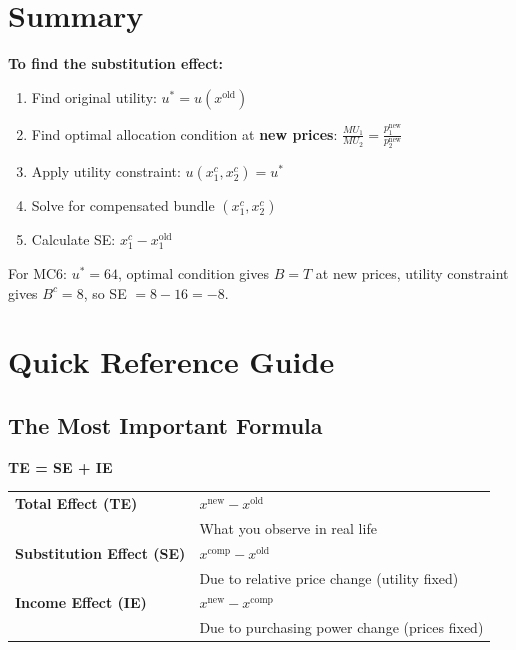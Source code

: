 \documentclass[11pt]{article}
\begin{document}
\section{Summary}

\textbf{To find the substitution effect:}

\begin{enumerate}
    \item Find original utility: $u^* = u(x^{\text{old}})$

    \item Find optimal allocation condition at \textbf{new prices}: $\frac{MU_1}{MU_2} = \frac{p_1^{\text{new}}}{p_2^{\text{new}}}$

    \item Apply utility constraint: $u(x_1^c, x_2^c) = u^*$

    \item Solve for compensated bundle $(x_1^c, x_2^c)$

    \item Calculate SE: $x_1^c - x_1^{\text{old}}$
\end{enumerate}

For MC6: $u^* = 64$, optimal condition gives $B = T$ at new prices, utility constraint gives $B^c = 8$, so SE $= 8 - 16 = -8$.

\newpage

\section{Quick Reference Guide}

\subsection{The Most Important Formula}

\begin{center}
\colorbox{blue!20}{
\LARGE
\textbf{TE = SE + IE}
}
\end{center}

\vspace{1em}

\begin{center}
\begin{tabular}{|l|p{8cm}|}
\hline
\textbf{Total Effect (TE)} & $x^{\text{new}} - x^{\text{old}}$ \\
& What you observe in real life \\
\hline
\textbf{Substitution Effect (SE)} & $x^{\text{comp}} - x^{\text{old}}$ \\
& Due to relative price change (utility fixed) \\
\hline
\textbf{Income Effect (IE)} & $x^{\text{new}} - x^{\text{comp}}$ \\
& Due to purchasing power change (prices fixed) \\
\hline
\end{tabular}
\end{center}
\end{document}
